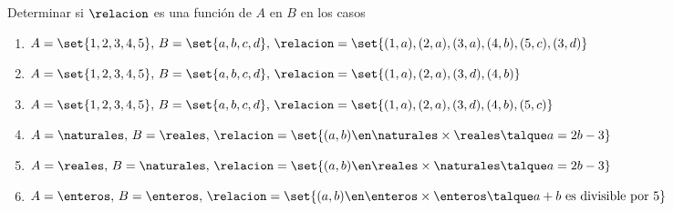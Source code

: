 \begin{enunciado}{\ejercicio}
  Determinar si $\relacion$ es una función de $A$ en $B$ en los casos
  \begin{enumerate}[label=\roman*)]
    \item $A = \set{1,2,3,4,5},\, B = \set{a,b,c,d},\, \relacion = \set{(1,a), (2,a),(3,a),(4,b),(5,c),(3,d)} $
    \item $A = \set{1,2,3,4,5},\, B = \set{a,b,c,d},\, \relacion = \set{(1,a), (2,a),(3,d),(4,b)}$
    \item $A = \set{1,2,3,4,5},\, B = \set{a,b,c,d},\, \relacion = \set{(1,a), (2,a),(3,d),(4,b),(5,c)} $
    \item $A = \naturales,\, B = \reales, \, \relacion = \set{(a,b) \en \naturales \times \reales \talque a = 2b - 3} $
    \item $A = \reales,\, B = \naturales, \, \relacion = \set{(a,b) \en \reales \times \naturales \talque a = 2b - 3} $
    \item $A = \enteros,\, B = \enteros, \, \relacion = \set{(a,b) \en \enteros \times \enteros \talque a +b \text{ es divisible por }5} $
  \end{enumerate}

\end{enunciado}
